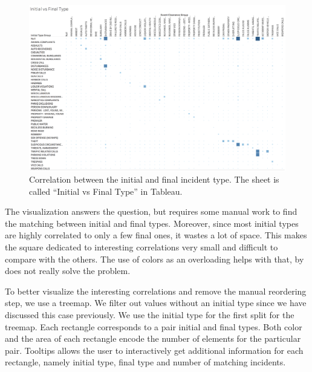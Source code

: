 \begin{figure}[h]
	\centering
	\includegraphics[width=\columnwidth]{figures/4_1_initial_vs_final_group_heatmap}
	\caption{Correlation between the initial and final incident type. The sheet is called ``Initial vs Final Type'' in Tableau.}
	\label{fig:4_1_initial_vs_final_group_heatmap}
\end{figure}

The visualization answers the question, but requires some manual work to find the matching between initial and final types.
Moreover, since most initial types are highly correlated to only a few final ones, it wastes a lot of space.
This makes the square dedicated to interesting correlations very small and difficult to compare with the others.
The use of colors as an overloading helps with that, by does not really solve the problem. 

To better visualize the interesting correlations and remove the manual reordering step, we use a treemap.
We filter out values without an initial type since we have discussed this case previously.
We use the initial type for the first split for the treemap.
Each rectangle corresponds to a pair initial and final types.
Both color and the area of each rectangle encode the number of elements for the particular pair.
Tooltips allows the user to interactively get additional information for each rectangle, namely initial type, final type and number of matching incidents.

